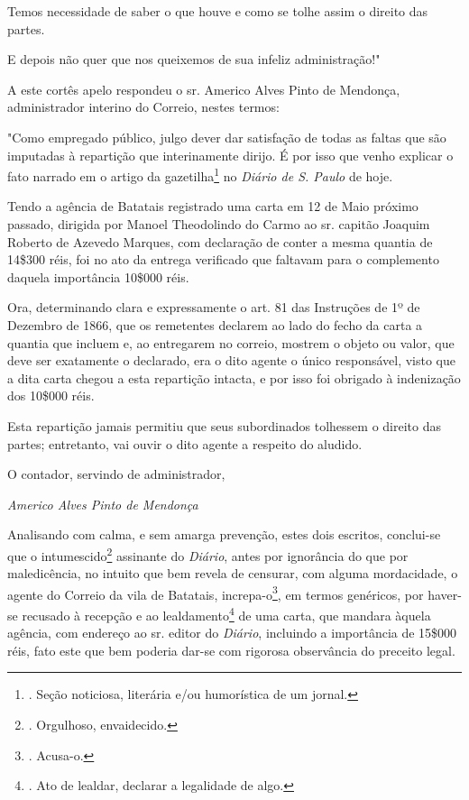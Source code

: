 Temos necessidade de saber o que houve e como se tolhe assim o direito
das partes.

E depois não quer que nos queixemos de sua infeliz administração!"

A este cortês apelo respondeu o sr. Americo Alves Pinto de Mendonça,
administrador interino do Correio, nestes termos:

"Como empregado público, julgo dever dar satisfação de todas as faltas
que são imputadas à repartição que interinamente dirijo. É por isso que
venho explicar o fato narrado em o artigo da gazetilha\footnote{. Seção
  noticiosa, literária e/ou humorística de um jornal.} no \emph{Diário
de S. Paulo} de hoje.

Tendo a agência de Batatais registrado uma carta em 12 de Maio próximo
passado, dirigida por Manoel Theodolindo do Carmo ao sr. capitão Joaquim
Roberto de Azevedo Marques, com declaração de conter a mesma quantia de
14\$300 réis, foi no ato da entrega verificado que faltavam para o
complemento daquela importância 10\$000 réis.

Ora, determinando clara e expressamente o art. 81 das Instruções de 1º
de Dezembro de 1866, que os remetentes declarem ao lado do fecho da
carta a quantia que incluem e, ao entregarem no correio, mostrem o
objeto ou valor, que deve ser exatamente o declarado, era o dito agente
o único responsável, visto que a dita carta chegou a esta repartição
intacta, e por isso foi obrigado à indenização dos 10\$000 réis.

Esta repartição jamais permitiu que seus subordinados tolhessem o
direito das partes; entretanto, vai ouvir o dito agente a respeito do
aludido.

O contador, servindo de administrador,

\emph{Americo Alves Pinto de Mendonça}

Analisando com calma, e sem amarga prevenção, estes dois escritos,
conclui-se que o intumescido\footnote{. Orgulhoso, envaidecido.}
assinante do \emph{Diário}, antes por ignorância do que por
maledicência, no intuito que bem revela de censurar, com alguma
mordacidade, o agente do Correio da vila de Batatais,
increpa-o\footnote{. Acusa-o.}, em termos genéricos, por haver-se
recusado à recepção e ao lealdamento\footnote{. Ato de lealdar, declarar
  a legalidade de algo.} de uma carta, que mandara àquela agência, com
endereço ao sr. editor do \emph{Diário}, incluindo a importância de
15\$000 réis, fato este que bem poderia dar-se com rigorosa observância
do preceito legal.

